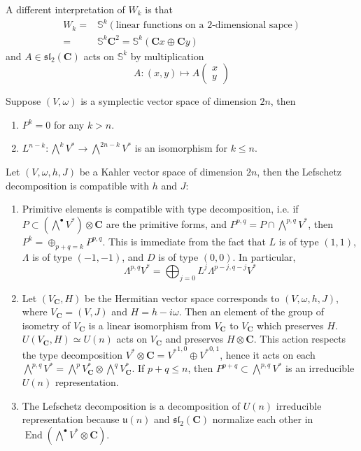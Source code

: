 \documentclass[
11pt, %
letterpaper， %
oneside, %
headinclude,footinclude, %
BCOR5mm, %
]{scrartcl}
\newcommand{\C}{{\mathbf{C}}}
\newcommand{\s}{{\mathbb{S}}}
\newcommand{\End}{\operatorname{End}}
\begin{document}
\begin{rem}
	A different interpretation of $W_k$ is that
	\begin{align*}
	W_k=&\s^k(\text{linear functions on a 2-dimensional sapce})\\
	=&\s^k \C^2=\s^k(\C x\oplus \C y)
	\end{align*} 
	and $A\in \mathfrak{sl}_2(\C)$ acts on $\s^k$ by multiplication $$A: (x,y) \mapsto A \begin{pmatrix}
	x \\ y
	\end{pmatrix}$$
\end{rem}
\begin{cor}
	Suppose $(V,\omega)$ is a symplectic vector space of dimension $2n$, then
	\begin{enumerate}
		\item $P^k=0$ for any $k>n$.
		\item $L^{n-k}:\bigwedge^{k} V^*\to \bigwedge^{2n-k} V^*$ is an isomorphism for $k\le n$.
	\end{enumerate}
\end{cor}
\begin{rem}
	Let $(V,\omega,h,J)$ be a Kahler vector space of dimension $2n$, then the Lefschetz decomposition is compatible with $h$ and $J$:
	\begin{enumerate}
		\item Primitive elements is compatible with type decomposition, i.e. if $P\subset (\bigwedge^{\bullet} V^*)\otimes \C$ are the primitive forms, and $P^{p,q}=P\cap \bigwedge^{p,q} V^*$, then $P^k=\oplus_{p+q=k}P^{p,q}$. This is immediate from the fact that $L$ is of type $(1,1)$, $\Lambda$ is of type $(-1,-1)$, and $D$ is of type $(0,0)$. In particular, 
		\begin{equation*}
		\Lambda^{p,q} V^*=\bigoplus_{j=0}L^j\Lambda^{p-j,q-j} V^*
		\end{equation*}
		\item Let $(V_{\C},H)$ be the Hermitian vector space corresponds to $(V,\omega,h,J)$, where
		$V_{\C}=(V,J)$ and $H=h-i\omega$. Then an element of the group of isometry of $V_{\C}$  is a linear isomorphism from $V_{\C}$ to  $V_{\C}$  which preserves $H$. $U(V_{\C}, H)\simeq U(n)$ acts on $V_{\C}$ and preserves $H\otimes {\C}$. This action respects the type decomposition $V^*\otimes \C= {V^*}^{1,0}\oplus {V^*}^{0,1}$, hence it acts on each $\bigwedge^{p,q}V^*=\bigwedge^{p}V^*_{\C}\otimes \bigwedge^{q}V^*_{\C}$. If $p+q\le n$, then $P^{p+q}\subset \bigwedge^{p,q}V^*$ is an irreducible $U(n)$ representation.
		\item The Lefschetz decomposition is a decomposition of $U(n)$ irreducible representation because $\mathfrak{u}(n)$ and $\mathfrak{sl}_2(\C)$ normalize each other in  $\End (\bigwedge^{\bullet}V^* \otimes \C)$.
	\end{enumerate}
\end{rem}
\end{document}
